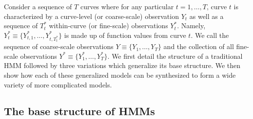 

Consider a sequence of $T$ curves where for any particular $t = 1,
\ldots,T$, curve $t$ is characterized by a curve-level (or coarse-scale) observation $Y_t$ as well as a sequence of $T^*_t$ within-curve (or fine-scale) observations $Y^*_{t}$. Namely, $Y^*_{t} \equiv \big\{Y^*_{t,1},\ldots,Y^*_{t,T^*_t}\big\}$ is made up of function values from curve $t$. We call the sequence of coarse-scale observations $Y \equiv \big\{Y_1, \ldots, Y_T\big\}$ and the collection of all fine-scale observations $Y^* \equiv \big\{Y^*_1,\ldots,Y^*_T \big\}$. We first detail the structure of a traditional HMM followed by three variations which generalize its base structure. We then show how each of these generalized models can be synthesized to form a wide variety of more complicated models.


\subsection{The base structure of HMMs}

